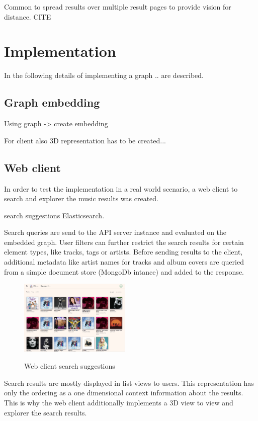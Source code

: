 \documentclass[a4paper]{llncs}
\begin{document}
	Common to spread results over multiple result pages to provide vision for distance. CITE
	
	
	\section{Implementation}
	In the following details of implementing a graph .. are described.
	
	\subsection{Graph embedding}
	Using graph -> create embedding
	
	
	For client also 3D representation has to be created...
	
	
	\subsection{Web client}
	In order to test the implementation in a real world scenario, a web client to search and explorer the music results was created.
	
	
	search suggestions Elasticsearch.
	
	Search queries are send to the API server instance and evaluated on the embedded graph. User filters can further restrict the search results for certain element types, like tracks, tags or artists. Before sending results to the client, additional metadata like artist names for tracks and album covers are queried from a simple document store (MongoDb intance) and added to the response.
	
	
	\begin{figure}[ht]
		{\includegraphics[width=200px]{web_client.png}}	
		\caption{Web client search suggestions}
		\label{fig:web_client}
	\end{figure}
	
	
	Search results are mostly displayed in list views to users. This representation has only the ordering as a one dimensional context information about the results. This is why the web client additionally implements a 3D view to view and explorer the search results.
	
\end{document}
